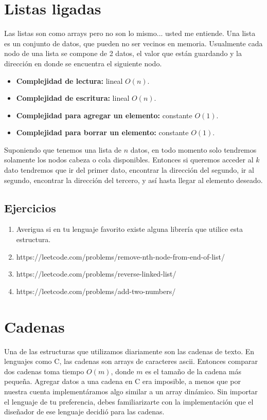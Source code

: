 \section{Listas ligadas}

Las listas son como arrays pero no son lo mismo... usted me entiende. Una lista es un conjunto de datos, que pueden no ser vecinos en memoria. Usualmente cada nodo de una lista se compone de 2 datos, el valor que están guardando y la dirección en donde se encuentra el siguiente nodo.


\begin{itemize}
    \item \textbf{Complejidad de lectura:} lineal $O(n)$.
    \item \textbf{Complejidad de escritura:} lineal $O(n)$.
    \item \textbf{Complejidad para agregar un elemento:} constante $O(1)$.
    \item \textbf{Complejidad para borrar un elemento:} constante $O(1)$.
\end{itemize}


Suponiendo que tenemos una lista de $n$ datos, en todo momento solo tendremos solamente los nodos cabeza o cola disponibles. Entonces si queremos acceder al $k$ dato tendremos que ir del primer dato, encontrar la dirección del segundo, ir al segundo, encontrar la dirección del tercero, y así hasta llegar al elemento deseado.

\subsection{Ejercicios}

\begin{enumerate}    
    \item Averigua si en tu lenguaje favorito existe alguna librería que utilice esta estructura.
    \item https://leetcode.com/problems/remove-nth-node-from-end-of-list/
    \item https://leetcode.com/problems/reverse-linked-list/
    \item https://leetcode.com/problems/add-two-numbers/
\end{enumerate}

\section{Cadenas}

Una de las estructuras que utilizamos diariamente son las cadenas de texto. En lenguajes como C, las cadenas son arrays de caracteres ascii. Entonces comparar dos cadenas toma tiempo $O(m)$, donde $m$ es el tamaño de la cadena más pequeña. Agregar datos a una cadena en C era imposible, a menos que por nuestra cuenta implementáramos algo similar a un array dinámico. Sin importar el lenguaje de tu preferencia, debes familiarizarte con la implementación que el diseñador de ese lenguaje decidió para las cadenas.

